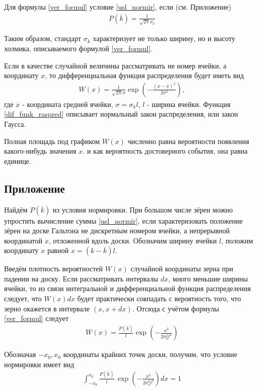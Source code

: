 Для формулы \eqref{ver_formul} условие \eqref{usl_normir}, если (см. Приложение)
\begin{align} \label{th:3:1}
	P(\overline{k}) = \frac{1}{\sqrt{2 \pi} \sigma_k}
\end{align}

Таким образом, стандарт $\sigma_k$ характеризует не только ширину, но и высоту холмика, описываемого формулой \eqref{ver_formul}.

Если в качестве случайной величины рассматривать не номер ячейки, а координату $x$, то дифференциальная функция распределения будет иметь вид
\begin{align} \label{dif_funk_raspred}
	W(x) = \frac{1}{\sqrt{2 \pi} \sigma} \exp \left(- \frac{(x - \overline{x})^2}{2 \sigma^2}\right),
\end{align}
где $\overline{x}$ - координата средней ячейки, $\sigma = \sigma_k l$, $l$ - ширина ячейки. Функция \eqref{dif_funk_raspred} описывает нормальный закон распределения, или закон Гаусса.

Полная площадь под графиком $W(x)$ численно равна вероятности появления какого-нибудь значения $x$. и как вероятность достоверного события, она равна единице.

\subsection{Приложение} \label{Pril}
Найдём $P(\overline{k})$ из условия нормировки. При большом числе зёрен можно упростить вычисление суммы \eqref{usl_normir}, если характеризовать положение зёрен на доске Гальтона не дискретным номером ячейки, а непрерывной координатой $x$, отложенной вдоль доски. Обозначим ширину ячейки $l$, положим координату $x$ равной $x = (k - \overline{k})l$.

Введём плотность вероятностей $W(x)$ случайной координаты зерна при падении на доску. Если рассматривать интервалы $dx$, много меньшие ширины ячейки, то из связи интегральной и дифференциальной функция распределения следует, что $W(x)dx$ будет практически совпадать с вероятность того, что зерно окажется в интервале $(x, x + dx)$. Отсюда с учётом формулы \eqref{ver_formul} следует
\begin{align} \label{th:4:1}
	W(x) = \frac{P(\overline{k})}{l} \exp \left( - \frac{x^2}{2 \sigma_k^2 l^2}\right)
\end{align}

Обозначая $-x_0, x_0$ координаты крайних точек доски, получим, что условие нормировки имеет вид
\begin{align} \label{th:4:2}
	\int_{-x_0}^{x_0} { \frac{P(\overline{k})}{l}\, \exp \left( - \frac{x^2}{2 \sigma_k^2 l^2}\right) dx} = 1
\end{align}

